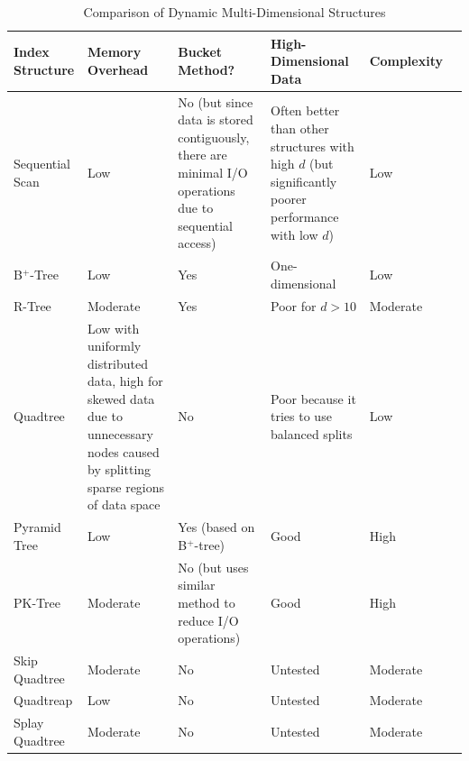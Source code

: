 \begin{table}
	\centering
	\begin{tabular}{|p{2.8cm}|p{2.3cm}|p{3cm}|p{3cm}|p{3.5cm}|p{2cm}|}
		\hline
		\textbf{Index Structure} &
		\textbf{Memory Overhead} &
		\textbf{Bucket Method?} &
		\textbf{High-Dimensional Data} &
		\textbf{Complexity} \\
		\hline
		Sequential Scan & Low & No (but since data is stored contiguously, there are minimal I/O operations due to sequential access) & Often better than other structures with high $d$ (but significantly poorer performance with low $d$) & Low \\		
		B${}^{+}$-Tree & Low & Yes & One-dimensional & Low \\
		R-Tree & Moderate & Yes & Poor for $d > 10$ \cite{pyramid-tree} & Moderate \\
		Quadtree & Low with uniformly distributed data, high for skewed data due to unnecessary nodes caused by splitting sparse regions of data space & No & Poor because it tries to use balanced splits \cite{pyramid-tree} & Low \\
		Pyramid Tree & Low & Yes (based on B${}^{+}$-tree) & Good & High \\
		PK-Tree & Moderate & No (but uses similar method to reduce I/O operations) & Good & High \\
		Skip Quadtree & Moderate & No & Untested & Moderate \\
		Quadtreap & Low & No & Untested & Moderate \\
		Splay Quadtree & Moderate & No & Untested & Moderate \\
		\hline
	\end{tabular}
	\caption{Comparison of Dynamic Multi-Dimensional Structures}
	\label{tab:comparison}
\end{table}

